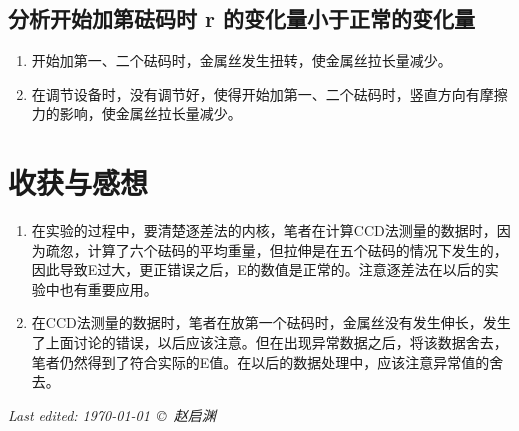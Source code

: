 \documentclass[a4paper,11pt]{article}
\begin{document}
	

	
\subsection{分析开始加第砝码时 r 的变化量小于正常的变化量}
    \begin{enumerate}
    	\item 开始加第一、二个砝码时，金属丝发生扭转，使金属丝拉长量减少。
    	\item 在调节设备时，没有调节好，使得开始加第一、二个砝码时，竖直方向有摩擦力的影响，使金属丝拉长量减少。
    	
    \end{enumerate}
	



	
\section{收获与感想}
\begin{enumerate}
	\item 在实验的过程中，要清楚逐差法的内核，笔者在计算CCD法测量的数据时，因为疏忽，计算了六个砝码的平均重量，但拉伸是在五个砝码的情况下发生的，因此导致E过大，更正错误之后，E的数值是正常的。注意逐差法在以后的实验中也有重要应用。
	\item 在CCD法测量的数据时，笔者在放第一个砝码时，金属丝没有发生伸长，发生了上面讨论的错误，以后应该注意。但在出现异常数据之后，将该数据舍去，笔者仍然得到了符合实际的E值。在以后的数据处理中，应该注意异常值的舍去。
\end{enumerate}



	\vfill\noindent\itshape\footnotesize
	\hfill Last edited: \today\ \copyright\ 赵启渊
\end{document}
